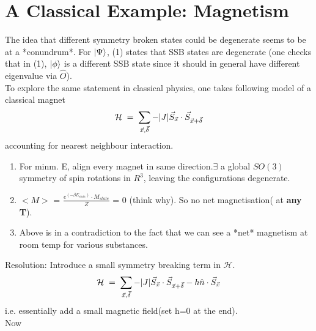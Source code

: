 \documentclass[12pt]{article}
\begin{document}
\section{A Classical Example: Magnetism}
The idea that different symmetry broken states could be degenerate seems to be at a *conundrum*. For $\ket{\Psi}$, (1) states that SSB states are degenerate (one checks that in (1), $\ket{\phi}$ is a different SSB state since it should in general have different eigenvalue via $\hat{O}$).\\
To explore the same statement in classical physics, one takes following model of a classical magnet
\begin{align}
    \mathcal{H}\;=\;\sum_{\Vec{x},\Vec{\delta}} - \abs{J} \Vec{S}_{\Vec{x}}\cdot\Vec{S}_{\Vec{x }+\Vec{\delta}}
\end{align}
accounting for nearest neighbour interaction.
\begin{enumerate}
    \item For minm. E, align every magnet in same direction.$\exists$ a global $SO(3)$ symmetry of spin rotations in $R^3$, leaving the configurations degenerate.
    \item $<M>$ = $\displaystyle{\frac{e^{(-\beta E_{state})}\cdot M_{state}}{Z}}$ = 0 (think why). So no net magnetisation( at \textbf{any T}).
    \item Above is in a contradiction to the fact that we can see a *net* magnetism at room temp for various substances.
\end{enumerate}
Resolution: Introduce a small symmetry breaking term in $\mathcal{H}$.
\begin{align}
    \mathcal{H}\;=\;\sum_{\Vec{x},\Vec{\delta}} - \abs{J} \Vec{S}_{\Vec{x}}\cdot\Vec{S}_{\Vec{x }+\Vec{\delta}} - h\hat{n}\cdot\Vec{S}_{\Vec{x}}
\end{align}
i.e. essentially add a small magnetic field(set h=0 at the end).\\
Now 
\end{document}

